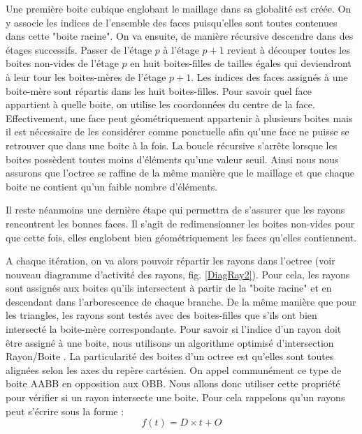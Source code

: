 Une première boite cubique englobant le maillage dans sa globalité est créée. On y associe les indices de l'ensemble des faces puisqu'elles sont toutes contenues dans cette "boite racine". On va ensuite, de manière récursive descendre dans des étages successifs. Passer de l'étage $p$ à l'étage $p+1$ revient à découper toutes les boites non-vides de l'étage $p$ en huit boites-filles de tailles égales qui deviendront à leur tour les boites-mères de l'étage $p+1$. Les indices des faces assignés à une boite-mère sont répartis dans les huit boites-filles. Pour savoir quel face appartient à quelle boite, on utilise les coordonnées du centre de la face. Effectivement, une face peut géométriquement appartenir à plusieurs boites mais il est nécessaire de les considérer comme ponctuelle afin qu'une face ne puisse se retrouver que dans une boite à la fois. La boucle récursive s'arrête lorsque les boites possèdent toutes moins d'éléments qu'une valeur seuil. Ainsi nous nous assurons que l'\gls{octree} se raffine de la même manière que le maillage et que chaque boite ne contient qu'un faible nombre d'éléments.


Il reste néanmoins une dernière étape qui permettra de s'assurer que les rayons rencontrent les bonnes faces. Il s'agit de redimensionner les boites non-vides pour que cette fois, elles englobent bien géométriquement les faces qu'elles contiennent.



 A chaque itération, on va alors pouvoir répartir les rayons dans l'\gls{octree} (voir nouveau diagramme d'activité des rayons, fig. \ref{DiagRay2}). Pour cela, les rayons sont assignés aux boites qu'ils intersectent à partir de la "boite racine" et en descendant dans l'arborescence de chaque branche. De la même manière que pour les triangles, les rayons sont testés avec des boites-filles que s'ils ont bien intersecté la boite-mère correspondante. Pour savoir si l'indice d'un rayon doit être assigné à une boite, nous utilisons un algorithme optimisé d'intersection Rayon/Boite \cite{AABB}. La particularité des boites d'un \gls{octree} est qu'elles sont toutes alignées selon les axes du repère cartésien. On appel communément ce type de boite \gls{AABB} en opposition aux \gls{OBB}. Nous allons donc utiliser cette propriété pour vérifier si un rayon intersecte une boite. Pour cela rappelons qu'un rayons peut s'écrire sous la forme : 
\begin{equation}
f(t) = D \times t + O
\end{equation}

